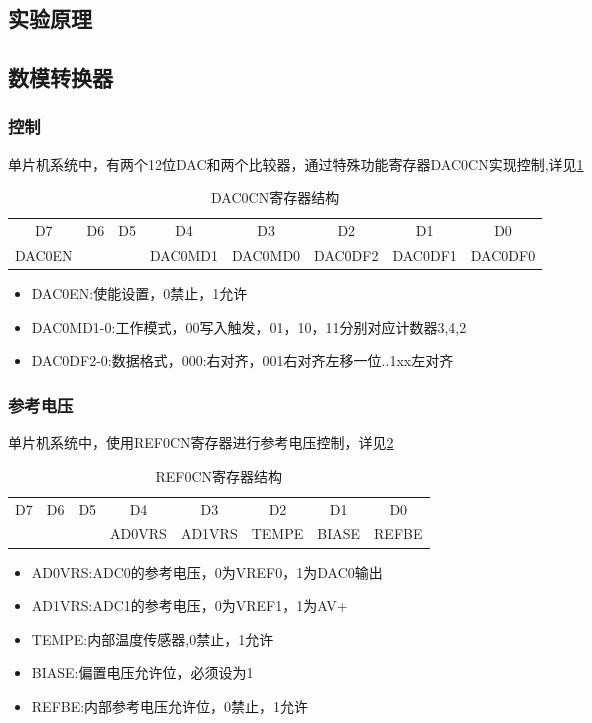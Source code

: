 \begin{CJK}
\section{实验原理}
\subsection{数模转换器}
\subsubsection{控制}
单片机系统中，有两个12位DAC和两个比较器，通过特殊功能寄存器DAC0CN实现控制,详见\ref{table_DAC0CN}
\begin{table}[!htbp]
  \centering
  \caption{DAC0CN寄存器结构}
  \label{table_DAC0CN}
\begin{tabular}{|c|c|c|c|c|c|c|c|}
  \hline
  D7&D6&D5&D4&D3&D2&D1&D0\\
  DAC0EN&&&DAC0MD1&DAC0MD0&DAC0DF2&DAC0DF1&DAC0DF0\\
\end{tabular}
\end{table}
\begin{itemize}
  \item DAC0EN:使能设置，0禁止，1允许
  \item DAC0MD1-0:工作模式，00写入触发，01，10，11分别对应计数器3,4,2
  \item DAC0DF2-0:数据格式，000:右对齐，001右对齐左移一位..1xx左对齐
\end{itemize}
\subsubsection{参考电压}
单片机系统中，使用REF0CN寄存器进行参考电压控制，详见\ref{table_REF0CN}
\begin{table}[!htbp]
  \caption{REF0CN寄存器结构}
  \label{table_REF0CN}
  \begin{tabular}{|c|c|c|c|c|c|c|c|}
    \hline
    D7&D6&D5&D4&D3&D2&D1&D0\\
    &&&AD0VRS&AD1VRS&TEMPE&BIASE&REFBE\\
    \hline
  \end{tabular}
\end{table}
\begin{itemize}
  \item AD0VRS:ADC0的参考电压，0为VREF0，1为DAC0输出
  \item AD1VRS:ADC1的参考电压，0为VREF1，1为AV+
  \item TEMPE:内部温度传感器,0禁止，1允许
  \item BIASE:偏置电压允许位，必须设为1
  \item REFBE:内部参考电压允许位，0禁止，1允许
\end{itemize}

\end{CJK}
